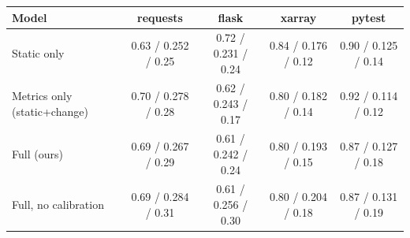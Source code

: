 \begin{tabular}{lcccc}
\toprule
Model & requests & flask & xarray & pytest \\
\midrule
Static only & 0.63 / 0.252 / 0.25 & 0.72 / 0.231 / 0.24 & 0.84 / 0.176 / 0.12 & 0.90 / 0.125 / 0.14 \\
Metrics only (static+change) & 0.70 / 0.278 / 0.28 & 0.62 / 0.243 / 0.17 & 0.80 / 0.182 / 0.14 & 0.92 / 0.114 / 0.12 \\
Full (ours) & 0.69 / 0.267 / 0.29 & 0.61 / 0.242 / 0.24 & 0.80 / 0.193 / 0.15 & 0.87 / 0.127 / 0.18 \\
Full, no calibration & 0.69 / 0.284 / 0.31 & 0.61 / 0.256 / 0.30 & 0.80 / 0.204 / 0.18 & 0.87 / 0.131 / 0.19 \\
\bottomrule
\end{tabular}
